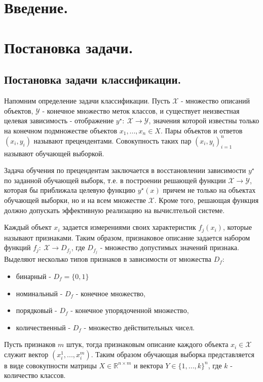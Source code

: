 \documentclass[12pt]{article}
\begin{document}
\tableofcontents
\newpage


\section{Введение.}


\section{Постановка задачи.}

\subsection{Постановка задачи классификации.}

\par
Напомним определение задачи классификации. 
Пусть $\mathcal{X}$ - множество описаний объектов, 
$\mathcal{Y}$ - конечное множество меток классов, и 
существует неизвестная целевая зависимость - отображение 
$y^\star:\ \mathcal{X} \to \mathcal{Y}$, 
значения которой известны только на конечном подмножестве объектов
$x_1, ..., x_n \in X$. Пары объектов и ответов $(x_i, y_i)$ называют прецендентами.
Совокупность таких пар ${(x_i, y_i)}_{i=1}^n$ называют обучающей выборкой.
\par
Задача обучения по прецендентам заключается в восстановлении зависимости $y^\star$
по заданной обучающей выборк, т.е. в построении решающей функции 
$\mathcal{X} \to \mathcal{Y}$, которая бы
приближала целевую функцию $y^\star(x)$ причем не только на объектах обучающей выборки,
но и на всем множестве $\mathcal{X}$. Кроме того, решающая функция должно допускать эффективную
реализацию на вычислтельой системе.
\par
Каждый объект $x_i$ задается измерениями своих характеристик $f_j(x_i)$, 
которые называют признаками. Таким образом, признаковое описание задается набором функций
$f_j:\ \mathcal{X}\to D_{f_j}$, где $D_{f_j}$ - множество допустимых значений признака.
Выделяют несколько типов признаков в зависимости от множества $D_f$:
\begin{itemize} 
\item бинарный - $D_f=\{0,1\}$
\item номинальный - $D_f$ - конечное множество,
\item порядковый - $D_f$ - конечное упорядоченной множество,
\item количественный - $D_f$ - множество действительных чисел.
\end{itemize}
Пусть признаков $m$ штук, тогда признаковым описание каждого объекта 
$x_i \in \mathcal{X}$ служит вектор $(x_i^1, ..., x_i^m)$. 
Таким образом обучающая выборка представляется в виде совокупности матрицы 
$X \in \mathbb{R}^{n \times m}$ и вектора $Y \in \{1, ..., k\}^n$, где 
$k$ - количество классов.
\end{document}
